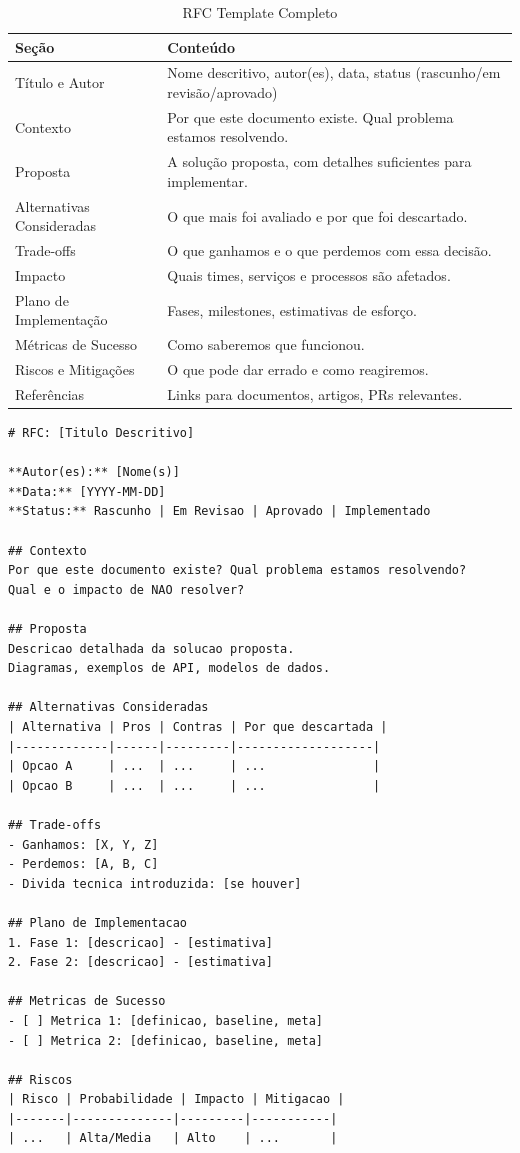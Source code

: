 \begin{table}[htbp]
\centering
\caption{RFC Template Completo}
\begin{tabular}{|p{3.5cm}|p{9.5cm}|}
\hline
\textbf{Seção} & \textbf{Conteúdo} \\
\hline
Título e Autor & Nome descritivo, autor(es), data, status (rascunho/em revisão/aprovado) \\
\hline
Contexto & Por que este documento existe. Qual problema estamos resolvendo. \\
\hline
Proposta & A solução proposta, com detalhes suficientes para implementar. \\
\hline
Alternativas Consideradas & O que mais foi avaliado e por que foi descartado. \\
\hline
Trade-offs & O que ganhamos e o que perdemos com essa decisão. \\
\hline
Impacto & Quais times, serviços e processos são afetados. \\
\hline
Plano de Implementação & Fases, milestones, estimativas de esforço. \\
\hline
Métricas de Sucesso & Como saberemos que funcionou. \\
\hline
Riscos e Mitigações & O que pode dar errado e como reagiremos. \\
\hline
Referências & Links para documentos, artigos, PRs relevantes. \\
\hline
\end{tabular}
\end{table}

\begin{lstlisting}[language={}, caption={Template de RFC em Markdown}]
# RFC: [Titulo Descritivo]

**Autor(es):** [Nome(s)]
**Data:** [YYYY-MM-DD]
**Status:** Rascunho | Em Revisao | Aprovado | Implementado

## Contexto
Por que este documento existe? Qual problema estamos resolvendo?
Qual e o impacto de NAO resolver?

## Proposta
Descricao detalhada da solucao proposta.
Diagramas, exemplos de API, modelos de dados.

## Alternativas Consideradas
| Alternativa | Pros | Contras | Por que descartada |
|-------------|------|---------|-------------------|
| Opcao A     | ...  | ...     | ...               |
| Opcao B     | ...  | ...     | ...               |

## Trade-offs
- Ganhamos: [X, Y, Z]
- Perdemos: [A, B, C]
- Divida tecnica introduzida: [se houver]

## Plano de Implementacao
1. Fase 1: [descricao] - [estimativa]
2. Fase 2: [descricao] - [estimativa]

## Metricas de Sucesso
- [ ] Metrica 1: [definicao, baseline, meta]
- [ ] Metrica 2: [definicao, baseline, meta]

## Riscos
| Risco | Probabilidade | Impacto | Mitigacao |
|-------|--------------|---------|-----------|
| ...   | Alta/Media   | Alto    | ...       |
\end{lstlisting}

